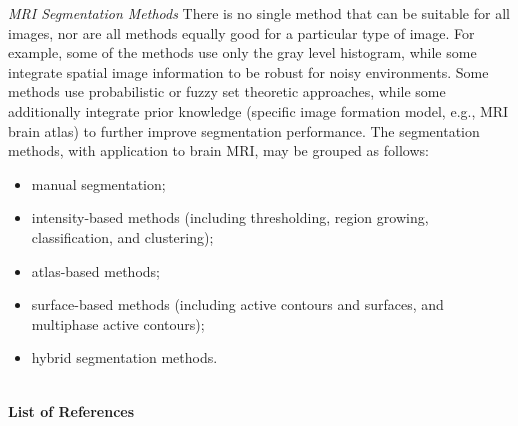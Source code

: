 \textit{MRI Segmentation Methods} There is no single method that can
be suitable for all images, nor are all methods equally good for a
particular type of image. For example, some of the methods use only
the gray level histogram, while some integrate spatial image information
to be robust for noisy environments. Some methods use probabilistic
or fuzzy set theoretic approaches, while some additionally integrate
prior knowledge (specific image formation model, e.g., MRI brain atlas)
to further improve segmentation performance. The segmentation methods,
with application to brain MRI, may be grouped as follows: 
\begin{itemize}
\item manual segmentation; 
\item intensity-based methods (including thresholding, region growing, classification,
and clustering); 
\item atlas-based methods; 
\item surface-based methods (including active contours and surfaces, and
multiphase active contours); 
\item hybrid segmentation methods. 
\end{itemize}
\hfill{}\\
\textbf{List of References}\\
\cite{09a1}